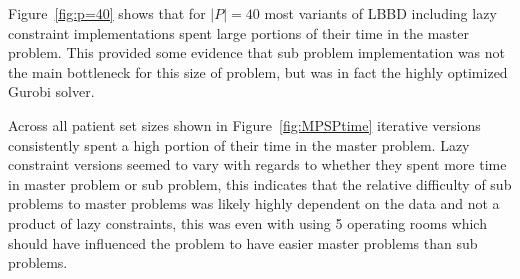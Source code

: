 Figure~\ref{fig:p=40} shows that for $|P|=40$ most variants of LBBD including lazy constraint implementations spent large portions of their time in the master problem. This provided some evidence that sub problem implementation was not the main bottleneck for this size of problem, but was in fact the highly optimized Gurobi solver. 

Across all patient set sizes shown in Figure~\ref{fig:MPSPtime} iterative versions consistently spent a high portion of their time in the master problem. Lazy constraint versions seemed to vary with regards to whether they spent more time in master problem or sub problem, this indicates that the relative difficulty of sub problems to master problems was likely highly dependent on the data and not a product of lazy constraints, this was even with using 5 operating rooms which should have influenced the problem to have easier master problems than sub problems\cite{roshanaei2017propagating}.